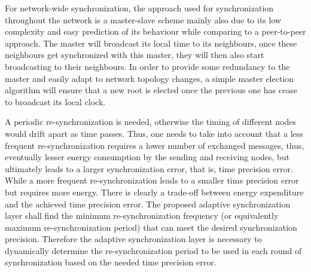 \documentclass[11pt,a4]{article}
\begin{document}
\begin{multicols}{2}
For network-wide synchronization, the approach used for synchronization throughout the network is a master-slave scheme mainly also due to its low complexity and easy prediction of its behaviour while comparing to a peer-to-peer approach. The master will broadcast its local time to its neighbours, once these neighbours get synchronized with this master, they will then also start broadcasting to their neighbours.  In order to provide some redundancy to the master and easily adapt to network topology changes, a simple master election algorithm will ensure that a new root is elected once the previous one has cease to broadcast its local clock.

A periodic re-synchronization is needed, otherwise the timing of different nodes would drift apart as time passes. Thus, one needs to take into account that a less frequent re-synchronization requires a lower number of exchanged messages, thus, eventually lesser energy consumption by the sending and receiving nodes, but ultimately leads to a larger synchronization error, that is, time precision error. While a more frequent re-synchronization leads to a smaller time precision error but requires more energy. There is clearly a trade-off between energy expenditure and the achieved time precision error. The proposed adaptive synchronization layer shall find the minimum re-synchronization frequency (or equivalently maximum re-synchronization period) that can meet the desired  synchronization precision. Therefore the adaptive synchronization layer is necessary to dynamically determine the re-synchronization period to be used in each round of synchronization based on the needed time precision error.


\end{multicols}
\end{document}
